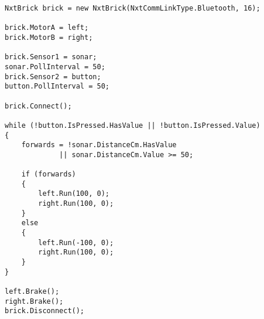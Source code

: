 \begin{lstlisting}[style=csharpsmall,caption={Et eksempel på et \mindsqualls program},label=mindsqualls:example]
NxtBrick brick = new NxtBrick(NxtCommLinkType.Bluetooth, 16);

brick.MotorA = left;
brick.MotorB = right;

brick.Sensor1 = sonar;
sonar.PollInterval = 50;
brick.Sensor2 = button;
button.PollInterval = 50;

brick.Connect();

while (!button.IsPressed.HasValue || !button.IsPressed.Value)
{
    forwards = !sonar.DistanceCm.HasValue
    	     || sonar.DistanceCm.Value >= 50;

    if (forwards)
    {
        left.Run(100, 0);
        right.Run(100, 0);
    }
    else
    {
        left.Run(-100, 0);
        right.Run(100, 0);
    }
}

left.Brake();
right.Brake();
brick.Disconnect();
\end{lstlisting}
